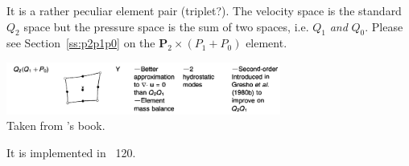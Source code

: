 It is a rather peculiar element pair (triplet?). The velocity space is the standard $Q_2$ space
but the pressure space is the sum of two spaces, i.e. $Q_1$ {\it and} $Q_0$.
Please see Section~\ref{ss:p2p1p0} on the ${\bm P}_2\times (P_1+P_0)$ element.

\begin{center}
\includegraphics[width=9cm]{images/pair_q2q1q0}\\
{\captionfont Taken from \textcite{grsa}'s book.}
\end{center}

It is implemented in \stone~120.
